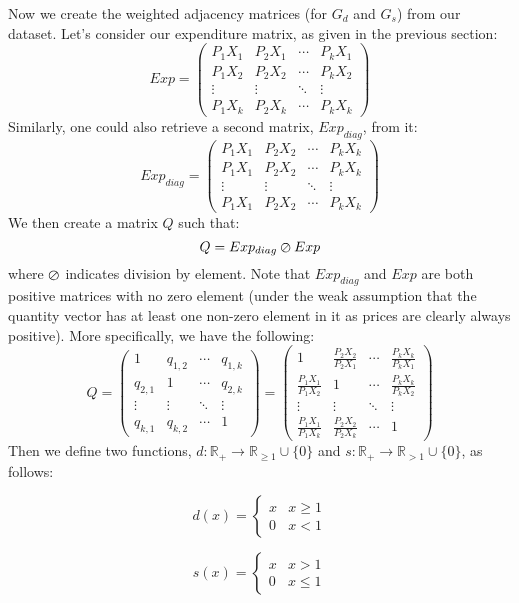 \documentclass{article} %
\theoremstyle{style1}
\theoremstyle{style1}
\theoremstyle{example}
\begin{document}
Now we create the weighted adjacency matrices (for $G_d$ and $G_s$) from our dataset. Let's consider our expenditure matrix, as given in the previous section:
\[
Exp = 
 \begin{pmatrix}
  P_1X_1 & P_2X_1 & \cdots & P_kX_1 \\
  P_1X_2 & P_2X_2 & \cdots & P_kX_2 \\
  \vdots  & \vdots  & \ddots & \vdots  \\
  P_1X_k & P_2X_k & \cdots & P_kX_k
 \end{pmatrix}
\]
Similarly, one could also retrieve a second matrix, $Exp_{diag}$, from it:
\[
Exp_{diag} = 
 \begin{pmatrix}
  P_1X_1 & P_2X_2 & \cdots & P_kX_k \\
  P_1X_1 & P_2X_2 & \cdots & P_kX_k \\
  \vdots  & \vdots  & \ddots & \vdots  \\
  P_1X_1 & P_2X_2 & \cdots & P_kX_k
 \end{pmatrix}
\]
We then create a matrix $Q$ such that:
\[
Q = Exp_{diag} \varoslash Exp
\]
where $\varoslash$ indicates division by element. Note that $Exp_{diag}$ and $Exp$ are both positive matrices with no zero element (under the weak assumption that the quantity vector has at least one non-zero element in it as prices are clearly always positive). More specifically, we have the following:
\[
Q = 
 \begin{pmatrix}
  1 & q_{1,2} & \cdots & q_{1,k} \\
  q_{2,1} & 1 & \cdots & q_{2,k} \\
  \vdots & \vdots & \ddots & \vdots \\
  q_{k,1} & q_{k,2} & \cdots & 1
 \end{pmatrix} =
 \begin{pmatrix}
 1 & \frac{P_2X_2}{P_2X_1} & \cdots & \frac{P_kX_k}{P_kX_1} \\[6pt]
 \frac{P_1X_1}{P_1X_2} & 1 & \cdots & \frac{P_kX_k}{P_kX_2} \\[6pt]
 \vdots & \vdots & \ddots & \vdots \\[6pt]
 \frac{P_1X_1}{P_1X_k} & \frac{P_2X_2}{P_2X_k} & \cdots & 1
 \end{pmatrix}
\]
Then we define two functions, $d:\mathbb{R}_{+}\to\mathbb{R}_{\geq1}\cup\{0\}$ and $s:\mathbb{R}_{+}\to\mathbb{R}_{>1}\cup\{0\}$, as follows:

\begin{minipage}{.5\linewidth}
\[ 
d(x)=
 \begin{cases} 
   x & x\geq1 \\
    0 & x<1
 \end{cases}
\]
\end{minipage}
\begin{minipage}{.5\linewidth}
\[
s(x)=
    \begin{cases} 
      x & x>1 \\
      0 & x\leq1
   \end{cases}
\]
\end{minipage}
\end{document}
